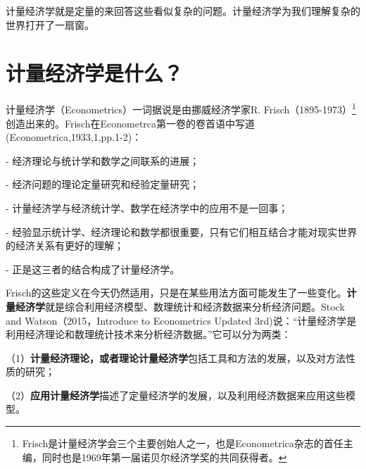 \documentclass[cn,12pt,math=newtx,citestyle=gb7714-2015,bibstyle=gb7714-2015]{elegantbook}
\begin{document}
	计量经济学就是定量的来回答这些看似复杂的问题。计量经济学为我们理解复杂的世界打开了一扇窗。
	\section{计量经济学是什么？}
	\begin{flushleft}
		计量经济学（Econometrics）一词据说是由挪威经济学家R. Frisch（1895-1973）\footnote{Frisch是计量经济学会三个主要创始人之一，也是Econometrica杂志的首任主编，同时也是1969年第一届诺贝尔经济学奖的共同获得者。}创造出来的。Frisch在Econometrca第一卷的卷首语中写道(Econometrica,1933,1,pp.1-2)：
		
		\item[-] 经济理论与统计学和数学之间联系的进展；
		
		\item[-] 经济问题的理论定量研究和经验定量研究；
		
		\item[-] 计量经济学与经济统计学、数学在经济学中的应用不是一回事；
		
		\item[-] 经验显示统计学、经济理论和数学都很重要，只有它们相互结合才能对现实世界的经济关系有更好的理解；
		
		\item[-] 正是这三者的结合构成了计量经济学。
		\par Frisch的这些定义在今天仍然适用，只是在某些用法方面可能发生了一些变化。\textbf{计量经济学}就是综合利用经济模型、数理统计和经济数据来分析经济问题。Stock and Watson（2015，Introduce to Econometrics Updated 3rd)说：“计量经济学是利用经济理论和数理统计技术来分析经济数据。”它可以分为两类：
		
		（1）\textbf{计量经济理论，或者理论计量经济学}包括工具和方法的发展，以及对方法性质的研究；
		
		（2）\textbf{应用计量经济学}描述了定量经济学的发展，以及利用经济数据来应用这些模型。
	\end{flushleft}
\end{document}
